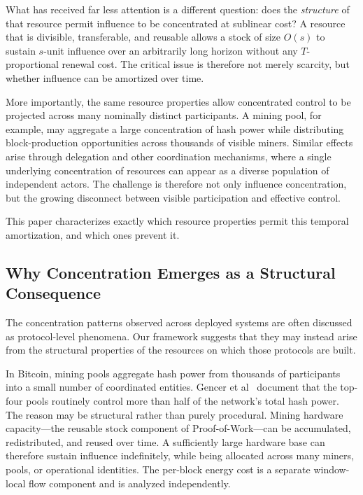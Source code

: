 \documentclass[manuscript,review]{acmart}
\theoremstyle{remark}
\begin{document}
	What has received far less attention is a different
	question: does the \emph{structure} of that resource
	permit influence to be concentrated at sublinear cost?
	A resource that is divisible, transferable, and reusable
	allows a stock of size $O(s)$ to sustain $s$-unit
	influence over an arbitrarily long horizon without any
	$T$-proportional renewal cost. The critical issue is
	therefore not merely scarcity, but whether influence can
	be amortized over time.
	
	More importantly, the same resource properties allow
	concentrated control to be projected across many
	nominally distinct participants. A mining pool, for
	example, may aggregate a large concentration of hash
	power while distributing block-production opportunities
	across thousands of visible miners. Similar effects arise
	through delegation and other coordination mechanisms,
	where a single underlying concentration of resources can
	appear as a diverse population of independent actors.
	The challenge is therefore not only influence
	concentration, but the growing disconnect between
	visible participation and effective control.
	
	
	This paper characterizes exactly which resource properties
	permit this temporal amortization, and which ones prevent it.
	
	\subsection{Why Concentration Emerges as a Structural Consequence}
	\label{ssec:concentration}
	
	The concentration patterns observed across deployed systems
	are often discussed as protocol-level phenomena.
	Our framework suggests that they may instead arise from the
	structural properties of the resources on which those
	protocols are built.
	
	In Bitcoin, mining pools aggregate hash power from thousands
	of participants into a small number of coordinated entities.
	Gencer et al~\cite{gencer2018decentralization} document
	that the top-four pools routinely control more than half of
	the network's total hash power.
	The reason may be structural rather than purely procedural.
	Mining hardware capacity---the reusable stock component of
	Proof-of-Work---can be accumulated, redistributed, and
	reused over time. A sufficiently large hardware base can
	therefore sustain influence indefinitely, while being
	allocated across many miners, pools, or operational
	identities. The per-block energy cost is a separate
	window-local flow component and is analyzed independently.
	
\end{document}
